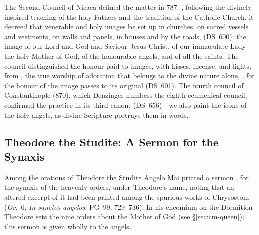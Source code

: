 The Second Council of Nicaea defined the matter in 787.
, following the divinely
inspired teaching of the holy Fathers and the tradition of the Catholic
Church, it decreed that venerable and holy images be set up in
churches, on sacred vessels and vestments, on walls and panels, in houses
and by the roads,  (DS~600): the
image of our Lord and God and Saviour Jesus Christ, of our immaculate Lady
the holy Mother of God, of the honourable angels, and of all the saints.
The council distinguished the honour paid to images, with kisses, incense,
and lights, from , the true worship of adoration that belongs to the
divine nature alone, , for
the honour of the image passes to its original (DS~601). The fourth council
of Constantinople (870), which Denzinger numbers the eighth ecumenical
council, confirmed the practice in its third canon:
 (DS~656)---we also paint the icons of the
holy angels, as divine Scripture portrays them in words.

\sectionguard
\subsection{Theodore the Studite: A Sermon for the Synaxis}\label{sec:bz-theodore}

Among the orations of Theodore the Studite Angelo Mai printed a sermon , for
the synaxis of the heavenly orders, under Theodore's name, noting that an altered excerpt of it had been
printed among the spurious works of Chrysostom (\emph{Or.}\ 6,
\emph{In sanctos angelos}; PG~99, 729--736). In his encomium on the
Dormition Theodore sets the nine orders about the Mother of God (see
\S\ref{sec:cm-queen}); this sermon is given wholly to the angels.

